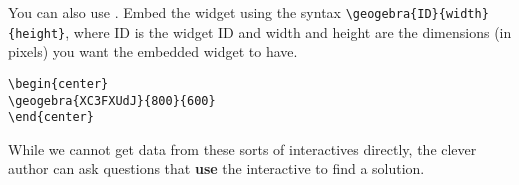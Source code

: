 \documentclass{ximera}
\begin{document}
You can also use . Embed the
widget using the syntax \verb|\geogebra{ID}{width}{height}|, where ID
is the widget ID and width and height are the dimensions (in pixels)
you want the embedded widget to have.
\begin{verbatim}
\begin{center}
\geogebra{XC3FXUdJ}{800}{600}
\end{center}
\end{verbatim}
\begin{center}
\end{center}

While we cannot get data from these sorts of interactives directly, the clever
author can ask questions that \textbf{use} the interactive to find a solution.
\end{document}
